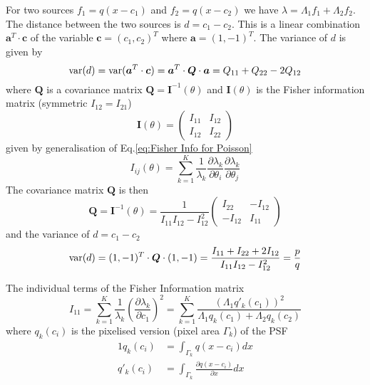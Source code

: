 For two sources $f_1=q(x-c_1)$ and $f_2=q(x-c_2)$ we have $\lambda=\Lambda_1f_1+\Lambda_2f_2$. The distance between the two sources is $d=c_1-c_2$. This is a linear combination $\bm{a}^{T}\cdot\bm{c}$ of the variable $\bm{c}=(c_1,c_2)^{T}$ where $\bm{a}=(1,-1)^{T}$. The variance of $d$ is given by 
%
\begin{equation}
	\mathrm{var}(d)=\mathrm{var}(\bm{a}^{T}\cdot\bm{c})=\bm{a}^{T}\cdot\bm{Q}\cdot\bm{a}=Q_{11}+Q_{22}-2Q_{12}
\end{equation}
%
where $\bm{Q}$ is a covariance matrix $\bm{Q}=\bm{I}^{-1}(\theta)$ and $\bm{I}(\theta)$ is the Fisher information matrix (symmetric
$I_{12}=I_{21}$)
%
\begin{equation}
	\bm{I}(\theta)=\left(
	\begin{array}{cc}
		I_{11} & I_{12}\\
		I_{12} & I_{22}
	\end{array}\right)
\end{equation}
%
given by generalisation of Eq.\eqref{eq:Fisher Info for Poisson}
%
\begin{equation}
	I_{ij}(\theta)=\sum_{k=1}^{K}\frac{1}{\lambda_k}\frac{\partial\lambda_k}{\partial\theta_i}\frac{\partial\lambda_k}{\partial\theta_j}
	\label{eq:Fisher Info gerneral lambda}
\end{equation}
%
The covariance matrix $\bm{Q}$ is then 
%
\begin{equation}
	\bm{Q}=\bm{I}^{-1}(\theta)=\frac{1}{I_{11}I_{12}-I_{12}^2}\left(
	\begin{array}{cc}
		I_{22} & -I_{12}\\
		-I_{12} & I_{11}
	\end{array}\right)
\end{equation}
%
and the variance of $d=c_1-c_2$ 
%
\begin{equation}
	\mathrm{var}(d)=(1,-1)^{T}\cdot\bm{Q}\cdot(1,-1)=\frac{I_{11}+I_{22}+2I_{12}}{I_{11}I_{12}-I_{12}^2}=\frac{p}{q}
	\label{eq:variance alternative}
\end{equation}

The individual terms of the Fisher Information matrix 
%
\begin{equation}
	I_{11}=\sum_{k=1}^{K}\frac{1}{\lambda_k}\left(\frac{\partial\lambda_k}{\partial c_1}\right)^2=\sum_{k=1}^{K}\frac{\left(\Lambda_1q'_k(c_1)\right)^2}{\Lambda_1q_k(c_1)+\Lambda_2q_k(c_2)}
\end{equation}
%
where $q_k(c_i)$ is the pixelised version (pixel area $\Gamma_k$) of the PSF
%
\begin{alignat*}{1}
	q_k(c_i) & =\int_{\Gamma_k}q(x-c_i)dx\\
	q'_k(c_i) & =\int_{\Gamma_k}\frac{\partial q(x-c_i)}{\partial x}dx
\end{alignat*}

